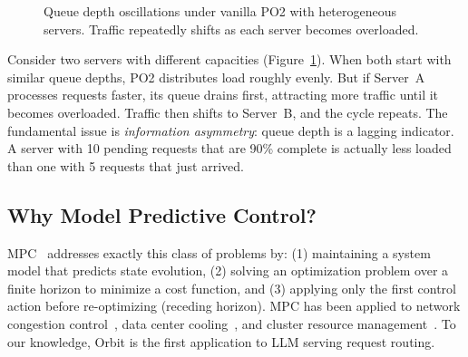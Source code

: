 \documentclass[runningheads]{llncs}
\begin{document}
\begin{figure}[t]
\centering
{}
\caption{Queue depth oscillations under vanilla PO2 with heterogeneous servers. Traffic repeatedly shifts as each server becomes overloaded.}
\label{fig:oscillation}
\end{figure}

Consider two servers with different capacities (Figure~\ref{fig:oscillation}). When both start with similar queue depths, PO2 distributes load roughly evenly. But if Server~A processes requests faster, its queue drains first, attracting more traffic until it becomes overloaded. Traffic then shifts to Server~B, and the cycle repeats. The fundamental issue is \textit{information asymmetry}: queue depth is a lagging indicator. A server with 10 pending requests that are 90\% complete is actually less loaded than one with 5 requests that just arrived.

\subsection{Why Model Predictive Control?}

MPC~\cite{camacho2013mpc} addresses exactly this class of problems by: (1) maintaining a system model that predicts state evolution, (2) solving an optimization problem over a finite horizon to minimize a cost function, and (3) applying only the first control action before re-optimizing (receding horizon). MPC has been applied to network congestion control~\cite{low2002internet}, data center cooling~\cite{lazic2018datacenter}, and cluster resource management~\cite{zhang2021mpc}. To our knowledge, Orbit is the first application to LLM serving request routing.
\end{document}
